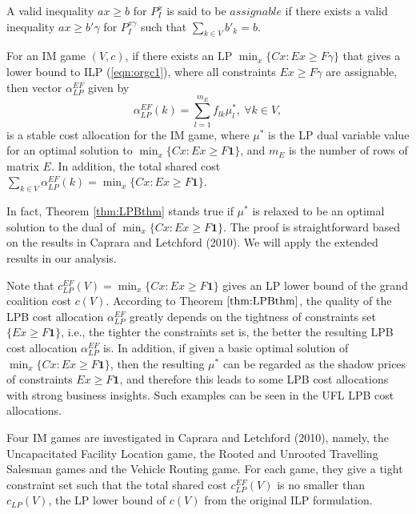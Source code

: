 \documentclass[ijoc,nonblindrev]{informs3-online-supplement} %
\begin{document}
\begin{APPENDICES}
\begin{definition}
A valid inequality $ax \geq b$ for $P_I^x$ is said to be $assignable$ if there exists a valid inequality $ax \geq b'\gamma$ for $P_I^{x\gamma}$ such that $\sum_{k \in V}b'_k = b$.
\end{definition}


\begin{theorem}\label{thm:LPBthm}
For an IM game $(V,c)$, if there exists an LP $\min_{x} \{Cx:Ex \geq F\gamma\}$ that gives a lower bound to ILP (\ref{eqn:orgc1}), where all constraints $Ex \geq F\gamma$ are assignable, then vector $\alpha_{LP}^{EF}$ given by
\begin{equation*}\label{eqn:LPBca}
\alpha_{LP}^{EF}(k) = \sum_{l=1}^{m_E} f_{lk}\mu_l^*,~\forall k \in V,
\end{equation*}
is a stable cost allocation for the IM game, where $\mu^*$ is the LP dual variable value for an optimal solution to $\min_{x} \{Cx:Ex \geq F\textbf{1}\}$, and $m_E$ is the number of rows of matrix $E$.
In addition, the total shared cost $\sum_{k \in V}\alpha_{LP}^{EF}(k) = \min_{x} \{Cx:Ex \geq F\textbf{1}\}$.
\end{theorem}

In fact, Theorem \ref{thm:LPBthm} stands true if $\mu^*$ is relaxed to be an optimal solution to the dual of $\min_{x} \{Cx:Ex \geq F\textbf{1}\}$. The proof is straightforward based on the results in Caprara and Letchford (2010). We will apply the extended results in our analysis.

Note that $c_{LP}^{EF}(V)=\min_{x} \{Cx:Ex \geq F\textbf{1}\}$ gives an LP lower bound of the grand coalition cost $c(V)$.
According to Theorem $\ref{thm:LPBthm}$, the quality of the LPB cost allocation $\alpha_{LP}^{EF}$ greatly depends on the tightness of constraints set $\{Ex \geq F\textbf{1}\}$, i.e., the tighter the constraints set is, the better the resulting  LPB cost allocation $\alpha_{LP}^{EF}$ is. In addition, if given a basic optimal solution of $\min_{x} \{Cx:Ex \geq F\textbf{1}\}$, then the resulting $\mu^*$ can be regarded as the shadow prices of constraints $Ex \geq F\textbf{1}$, and therefore this leads to some LPB cost allocations with strong business insights. Such examples can be seen in the UFL LPB cost allocations.

Four IM games are investigated in Caprara and Letchford (2010), namely, the Uncapacitated Facility Location game, the Rooted and Unrooted Travelling Salesman games and the Vehicle Routing game. For each game, they give a tight constraint set such that the total shared cost $c_{LP}^{EF}(V)$ is no smaller than $c_{LP}(V)$, the LP lower bound of $c(V)$ from the original ILP formulation.


\end{APPENDICES}
\end{document}

